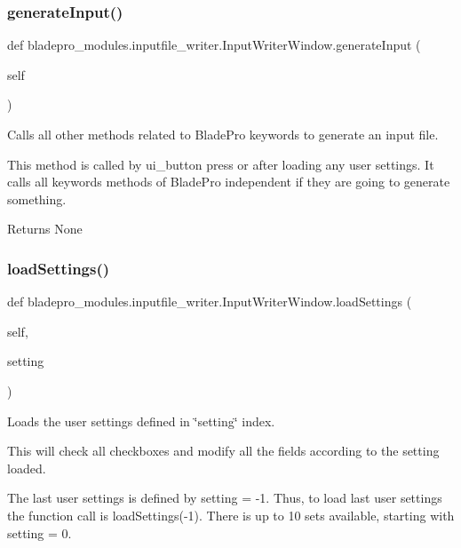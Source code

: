 \subsubsection{\texorpdfstring{generate\+Input()}{generateInput()}}
{\footnotesize\ttfamily def bladepro\+\_\+modules.\+inputfile\+\_\+writer.\+Input\+Writer\+Window.\+generate\+Input (\begin{DoxyParamCaption}\item[{}]{self }\end{DoxyParamCaption})}



Calls all other methods related to Blade\+Pro keywords to generate an input file. 

This method is called by ui\+\_\+button press or after loading any user settings. It calls all keywords methods of Blade\+Pro independent if they are going to generate something.

\begin{DoxyReturn}{Returns}
None 
\end{DoxyReturn}
\hypertarget{a00073_a0c4f30850537553db0ff2e27059733a4}{}\label{a00073_a0c4f30850537553db0ff2e27059733a4} 
\subsubsection{\texorpdfstring{load\+Settings()}{loadSettings()}}
{\footnotesize\ttfamily def bladepro\+\_\+modules.\+inputfile\+\_\+writer.\+Input\+Writer\+Window.\+load\+Settings (\begin{DoxyParamCaption}\item[{}]{self,  }\item[{}]{setting }\end{DoxyParamCaption})}



Loads the user settings defined in \char`\"{}setting\char`\"{} index. 

This will check all checkboxes and modify all the fields according to the setting loaded.

The last user settings is defined by setting = -\/1. Thus, to load last user settings the function call is load\+Settings(-\/1). There is up to 10 sets available, starting with setting = 0.


